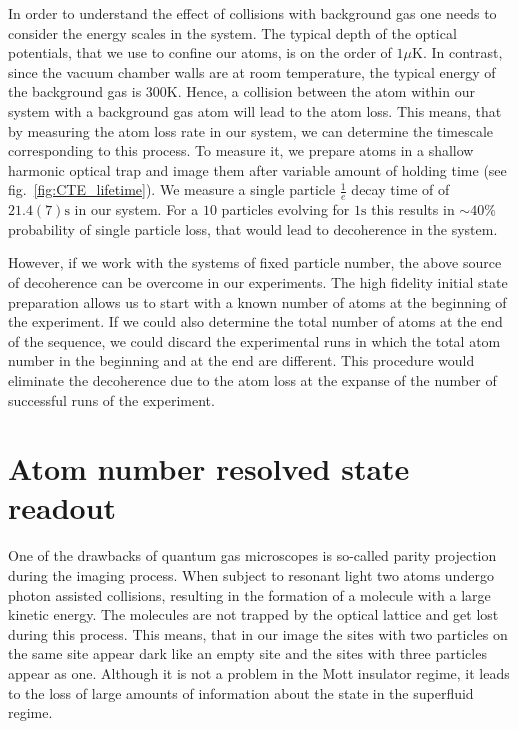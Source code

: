 In order to understand the effect of collisions with background gas one needs to consider the energy scales in the system. The typical depth of the optical potentials, that we use to confine our atoms, is on the order of $1 \mu \textrm{K}$. In contrast, since the vacuum chamber walls are at room temperature, the typical energy of the background gas is $300 \textrm{K}$. Hence, a collision between the atom within our system with a background gas atom will lead to the atom loss. This means, that by measuring the atom loss rate in our system, we can determine the timescale corresponding to this process. To measure it, we prepare atoms in a shallow harmonic optical trap and image them after variable amount of holding time (see fig.~\ref{fig:CTE_lifetime}). We measure a single particle $\frac{1}{e}$ decay time of of $21.4(7)\textrm{s}$ in our system. For a $10$ particles  evolving for $1\textrm{s}$ this results in $\sim 40\%$ probability of single particle loss, that would lead to decoherence in the system.

However, if we work with the systems of fixed particle number, the above source of decoherence can be overcome in our experiments. The high fidelity initial state preparation allows us to start with a known number of atoms at the beginning of the experiment. If we could also determine the total number of atoms at the end of the sequence, we could discard the experimental runs in which the total atom number in the beginning and at the end are different. This procedure would eliminate the decoherence due to the atom loss at the expanse of the number of successful runs of the experiment.

\section{Atom number resolved state readout}
One of the drawbacks of quantum gas microscopes is so-called parity projection during the imaging process. When subject to resonant light two atoms undergo photon assisted collisions, resulting in the formation of a molecule with a large kinetic energy. The molecules are not trapped by the optical lattice and get lost during this process. This means, that in our image the sites with two particles on the same site appear dark like an empty site and the sites with three particles appear as one. Although it is not a problem in the Mott insulator regime, it leads to the loss of large amounts of information about the state in the superfluid regime. 

